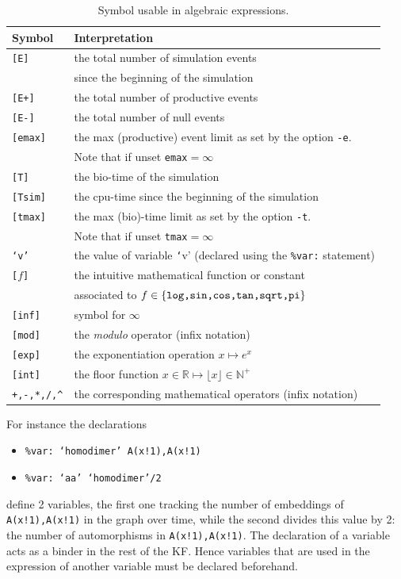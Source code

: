\documentclass[11pt]{book}
\def\ttt#1{\texttt{#1}}
\def\noi{\noindent}
\def\set#1{\{#1\}}
\def\ITE#1{\begin{itemize}#1\end{itemize}}
\def\Real{\mathbb R}
\def\Nat{\mathbb N}
\begin{document}
\begin{table}[htbp]
\centering
\begin{tabular}{@{} l|l @{} }
\toprule
Symbol & Interpretation \\
\midrule
\ttt{[E]} & the total number of simulation events\index{event}\\
& since the beginning of the simulation \\
\ttt{[E+]} & the total number of productive events\index{event} \\
\ttt{[E-]} & the total number of null events\index{event}\\
\ttt{[emax]} & the max (productive) event limit as set by the option \ttt{-e}. \\ &Note that if unset \ttt{emax}$=\infty$\\
\ttt{[T]} & the bio-time of the simulation \\
\ttt{[Tsim]} & the cpu-time since the beginning of the simulation \\
\ttt{[tmax]} & the max (bio)-time limit as set by the option \ttt{-t}. \\ &Note that if unset \ttt{tmax}$=\infty$\\

\ttt{`v'} & the value of variable {\ttt `v'} (declared using the \ttt{\%var:} statement) \\
\ttt{[}$f$\texttt{]} & the intuitive mathematical function or constant \\ &associated to $f\in\set{\hbox{\ttt{log,sin,cos,tan,sqrt,pi}}}$ \\
\ttt{[inf]} & symbol for $\infty$ \\
\ttt{[mod]} & the \emph{modulo} operator (infix notation)\\
\ttt{[exp]} & the exponentiation operation $x\mapsto e^x$ \\
\ttt{[int]} & the floor function $x\in\Real\mapsto \lfloor x\rfloor\in\Nat^+$ \\
\ttt{+,-,*,/,\^} & the corresponding mathematical operators (infix notation)\\
\bottomrule
\end{tabular}\caption{Symbol usable in algebraic expressions.}
\label{tab:operators}
\end{table}
\noi For instance the declarations
\ITE{
\item[] \ttt{\%var: `homodimer' A(x!1),A(x!1)}
\item[] \ttt{\%var: `aa' `homodimer'/2}
}
define 2 variables, the first one tracking the number of embeddings of \ttt{A(x!1),A(x!1)} in the graph over time, while the second divides this value by 2: the number of automorphisms in \ttt{A(x!1),A(x!1)}. The declaration of a variable acts as a binder in the rest of the KF. Hence variables that are used in the expression of another variable must be declared beforehand. 
\end{document}

